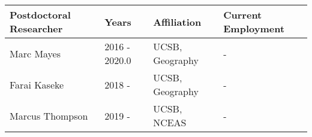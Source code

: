 
\begin{longtable}{lp{1.5cm} p{3.5cm}p{4.5cm}}
Postdoctoral Researcher & Years & Affiliation & Current Employment\\
\hline 
\endhead 
Marc Mayes & 2016 - 2020.0 & UCSB, Geography &  -   \\
Farai Kaseke & 2018 -  & UCSB, Geography &  -   \\
Marcus Thompson & 2019 -  & UCSB, NCEAS &  -   \\
\end{longtable}


